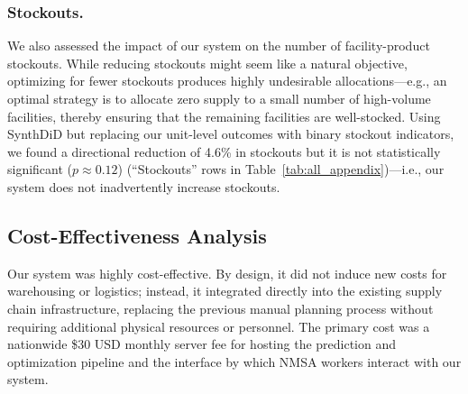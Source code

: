 \documentclass[12pt]{article}
\begin{document}
\subsubsection{Stockouts.} We also assessed the impact of our system on the number of facility-product stockouts. While reducing stockouts might seem like a natural objective, optimizing for fewer stockouts produces highly undesirable allocations---e.g., an optimal strategy is to allocate zero supply to a small number of high-volume facilities, thereby ensuring that the remaining facilities are well-stocked. Using SynthDiD but replacing our unit-level outcomes with binary stockout indicators, we found a directional reduction of 4.6\% in stockouts but it is not statistically significant ($p\approx0.12$) (``Stockouts'' rows in Table~\ref{tab:all_appendix})---i.e., our system does not inadvertently increase stockouts.


\subsection{Cost-Effectiveness Analysis}
\label{sup:cost}

Our system was highly cost-effective. By design, it did not induce new costs for warehousing or logistics; instead, it integrated directly into the existing supply chain infrastructure, replacing the previous manual planning process without requiring additional physical resources or personnel. The primary cost was a nationwide \$30 USD monthly server fee for hosting the prediction and optimization pipeline and the interface by which NMSA workers interact with our system.
\end{document}

